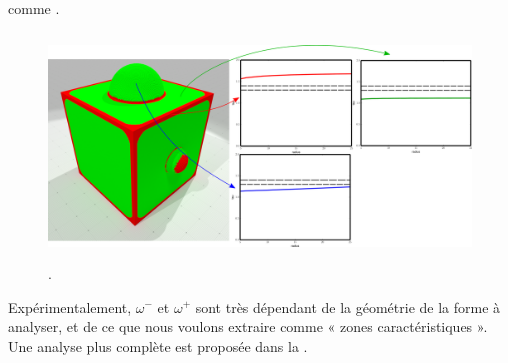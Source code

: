 comme \Feature.
%
\begin{figure}[ht]{
  \begin{center}
    \includegraphics[height=6cm]{figures/CubeSpherePlotTensor}
  \end{center}}
    \caption[.]{.
    \label{fig:tensor-cubesphere}}
\end{figure}
%
Expérimentalement, $\omega^-$ et $\omega^+$ sont très dépendant de la géométrie
de la forme à analyser, et de ce que nous voulons extraire comme « zones
caractéristiques ». Une analyse plus complète est proposée dans la
.
%
